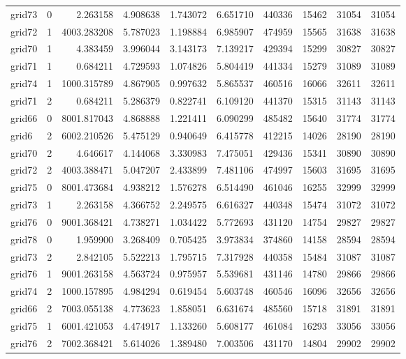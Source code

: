 \begin{longtable}{|l|r|r|r|r|r|r|r|r|r|}
grid73 & 0 & 2.263158 & 4.908638 & 1.743072 & 6.651710 & 440336 & 15462 & 31054 & 31054 \\
grid72 & 1 & 4003.283208 & 5.787023 & 1.198884 & 6.985907 & 474959 & 15565 & 31638 & 31638 \\
grid70 & 1 & 4.383459 & 3.996044 & 3.143173 & 7.139217 & 429394 & 15299 & 30827 & 30827 \\
grid71 & 1 & 0.684211 & 4.729593 & 1.074826 & 5.804419 & 441334 & 15279 & 31089 & 31089 \\
grid74 & 1 & 1000.315789 & 4.867905 & 0.997632 & 5.865537 & 460516 & 16066 & 32611 & 32611 \\
grid71 & 2 & 0.684211 & 5.286379 & 0.822741 & 6.109120 & 441370 & 15315 & 31143 & 31143 \\
grid66 & 0 & 8001.817043 & 4.868888 & 1.221411 & 6.090299 & 485482 & 15640 & 31774 & 31774 \\
grid6 & 2 & 6002.210526 & 5.475129 & 0.940649 & 6.415778 & 412215 & 14026 & 28190 & 28190 \\
grid70 & 2 & 4.646617 & 4.144068 & 3.330983 & 7.475051 & 429436 & 15341 & 30890 & 30890 \\
grid72 & 2 & 4003.388471 & 5.047207 & 2.433899 & 7.481106 & 474997 & 15603 & 31695 & 31695 \\
grid75 & 0 & 8001.473684 & 4.938212 & 1.576278 & 6.514490 & 461046 & 16255 & 32999 & 32999 \\
grid73 & 1 & 2.263158 & 4.366752 & 2.249575 & 6.616327 & 440348 & 15474 & 31072 & 31072 \\
grid76 & 0 & 9001.368421 & 4.738271 & 1.034422 & 5.772693 & 431120 & 14754 & 29827 & 29827 \\
grid78 & 0 & 1.959900 & 3.268409 & 0.705425 & 3.973834 & 374860 & 14158 & 28594 & 28594 \\
grid73 & 2 & 2.842105 & 5.522213 & 1.795715 & 7.317928 & 440358 & 15484 & 31087 & 31087 \\
grid76 & 1 & 9001.263158 & 4.563724 & 0.975957 & 5.539681 & 431146 & 14780 & 29866 & 29866 \\
grid74 & 2 & 1000.157895 & 4.984294 & 0.619454 & 5.603748 & 460546 & 16096 & 32656 & 32656 \\
grid66 & 2 & 7003.055138 & 4.773623 & 1.858051 & 6.631674 & 485560 & 15718 & 31891 & 31891 \\
grid75 & 1 & 6001.421053 & 4.474917 & 1.133260 & 5.608177 & 461084 & 16293 & 33056 & 33056 \\
grid76 & 2 & 7002.368421 & 5.614026 & 1.389480 & 7.003506 & 431170 & 14804 & 29902 & 29902 \\

\end{longtable}
